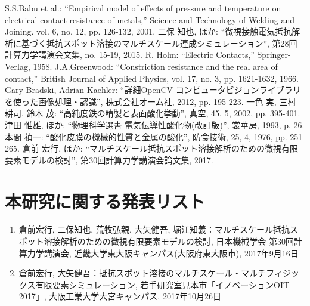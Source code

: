 %
\begin{thebibliography}{99}
 S.S.Babu et al.: ``Empirical model of effects of pressure and temperature on electrical contact resistance of metals,'' Science and Technology of Welding and Joining. vol. 6, no. 12, pp. 126-132, 2001. 
 二保 知也, ほか: ``微視接触電気抵抗解析に基づく抵抗スポット溶接のマルチスケール連成シミュレーション'', 第28回計算力学講演会文集, no. 15-19, 2015. 
 R. Holm: ``Electric Contacts,'' Springer-Verlag, 1958. 
 J.A.Greenwood: ``Constriction resistance and the real area of contact,'' British Journal of Applied Physics, vol. 17, no. 3, pp. 1621-1632, 1966. 
 Gary Bradski, Adrian Kaehler: ``詳細OpenCV コンピュータビジョンライブラリを使った画像処理・認識'', 株式会社オーム社, 2012, pp. 195-223. 
 一色 実, 三村 耕司, 鈴木 茂: ``高純度鉄の精製と表面酸化挙動'', 真空, 45, 5, 2002, pp. 395-401. 
 津田 惟雄, ほか: ``物理科学選書 電気伝導性酸化物(改訂版)'', 裳華房, 1993, p. 26. 
 本間 禎一: ``酸化皮膜の機械的性質と金属の酸化'', 防食技術, 25, 4, 1976, pp. 251-265. 
 倉前 宏行, ほか: ``マルチスケール抵抗スポット溶接解析のための微視有限要素モデルの検討'', 第30回計算力学講演会論文集, 2017. 
\end{thebibliography}

\section*{本研究に関する発表リスト}
\begin{enumerate}
\renewcommand{\labelenumi}{[\arabic{enumi}]}
\item
倉前宏行, 二保知也, 荒牧弘親, 大矢健吾, 堀江知義：マルチスケール抵抗スポット溶接解析のための微視有限要素モデルの検討, 日本機械学会 第30回計算力学講演会, 近畿大学東大阪キャンパス(大阪府東大阪市), 2017年9月16日

\item
倉前宏行, 大矢健吾：抵抗スポット溶接のマルチスケール・マルチフィジックス有限要素シミュレーション, 若手研究室見本市「イノベーションOIT 2017」, 大阪工業大学大宮キャンパス, 2017年10月26日
\end{enumerate}




\endinput
